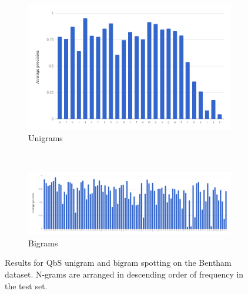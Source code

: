 \documentclass[ms,electronic,twosidetoc,letterpaper,chaptercenter,parttop,lof,lot]{byumsphd}
\begin{document}
\begin{figure}
\centering
\begin{subfigure}{.99\textwidth}
  \centering
  \includegraphics[width=.75\linewidth]{benthamUniSpot}
  \caption{Unigrams}
  \label{fig:benthamUniSpot}
\end{subfigure}
\\
\begin{subfigure}{.99\textwidth}
  \centering
  \includegraphics[width=.99\linewidth]{benthamBiSpot}
  \caption{Bigrams}
  \label{fig:benthamBiSpot}
\end{subfigure}
\caption{Results for QbS unigram and bigram spotting on the Bentham dataset. N-grams are arranged in descending order of frequency in the test set.}
\label{fig:benthamsub}
\end{figure}
\end{document}
